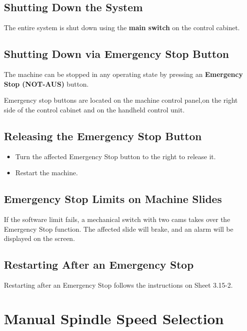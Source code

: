 \subsection{Shutting Down the System}
The entire system is shut down using the \textbf{main switch} on the control cabinet.

\subsection{Shutting Down via Emergency Stop Button}
The machine can be stopped in any operating state by pressing an \textbf{Emergency Stop (NOT-AUS)} button.

Emergency stop buttons are located on the machine control panel,on the right side of the control cabinet and on the handheld control unit.

\subsection{Releasing the Emergency Stop Button}


\begin{itemize}
    \item Turn the affected Emergency Stop button to the right to release it.
    \item Restart the machine.
\end{itemize}

\subsection{Emergency Stop Limits on Machine Slides}
If the software limit fails, a mechanical switch with two cams takes over the Emergency Stop function.  
The affected slide will brake, and an alarm will be displayed on the screen.

\subsection{Restarting After an Emergency Stop}
Restarting after an Emergency Stop follows the instructions on Sheet 3.15-2.

\section{Manual Spindle Speed Selection}

\setcounter{section}{3}
\setcounter{page}{2}

